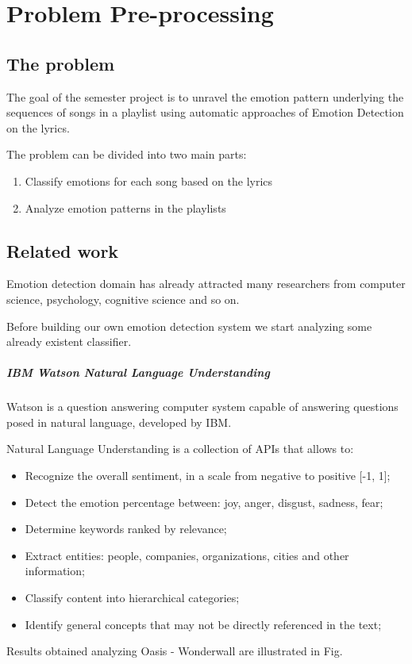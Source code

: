 \chapter{Problem Pre-processing}
\section{The problem}
The goal of the semester project is to unravel the emotion pattern underlying the sequences of songs in a playlist using automatic approaches of Emotion Detection on the lyrics.\par
The problem can be divided into two main parts:
\begin{enumerate}
\item Classify emotions for each song based on the lyrics
\item Analyze emotion patterns in the playlists
\end{enumerate}

\section{Related work}
Emotion detection domain has already attracted many researchers from computer science, psychology, cognitive science and so on. \par
Before building our own emotion detection system we start analyzing some already existent classifier. \par
\paragraph{IBM Watson Natural Language Understanding}\cite{ibm_watson}
Watson is a question answering computer system capable of answering questions posed in natural language, developed by IBM.\par
Natural Language Understanding is a collection of APIs that allows to:
\begin{itemize}
\item Recognize the overall sentiment, in a scale from negative to positive [-1, 1];
\item Detect the emotion percentage between: joy, anger, disgust, sadness, fear;
\item Determine keywords ranked by relevance;
\item Extract entities: people, companies, organizations, cities and other information;
\item Classify content into hierarchical categories;
\item Identify general concepts that may not be directly referenced in the text; 
\end{itemize}
Results obtained analyzing Oasis - Wonderwall are illustrated in Fig.


